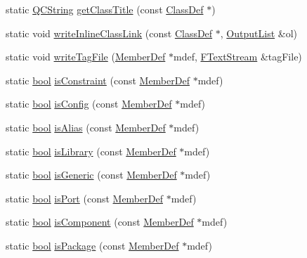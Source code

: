 \begin{DoxyCompactItemize}
\item 
static \hyperlink{class_q_c_string}{Q\+C\+String} \hyperlink{class_vhdl_doc_gen_ad5d4c791af3f2943467c7c7af558d83a}{get\+Class\+Title} (const \hyperlink{class_class_def}{Class\+Def} $\ast$)
\item 
static void \hyperlink{class_vhdl_doc_gen_a67f47b8dc11d967ee47e9bda86fff7e0}{write\+Inline\+Class\+Link} (const \hyperlink{class_class_def}{Class\+Def} $\ast$, \hyperlink{class_output_list}{Output\+List} \&ol)
\item 
static void \hyperlink{class_vhdl_doc_gen_afc349098219c01208def69e00f05e0e2}{write\+Tag\+File} (\hyperlink{class_member_def}{Member\+Def} $\ast$mdef, \hyperlink{class_f_text_stream}{F\+Text\+Stream} \&tag\+File)
\item 
static \hyperlink{qglobal_8h_a1062901a7428fdd9c7f180f5e01ea056}{bool} \hyperlink{class_vhdl_doc_gen_adb04cd03e2039ecab3a0a8f31ee4c890}{is\+Constraint} (const \hyperlink{class_member_def}{Member\+Def} $\ast$mdef)
\item 
static \hyperlink{qglobal_8h_a1062901a7428fdd9c7f180f5e01ea056}{bool} \hyperlink{class_vhdl_doc_gen_a57efdf5bddd0b36667c8aa21256ebac7}{is\+Config} (const \hyperlink{class_member_def}{Member\+Def} $\ast$mdef)
\item 
static \hyperlink{qglobal_8h_a1062901a7428fdd9c7f180f5e01ea056}{bool} \hyperlink{class_vhdl_doc_gen_af13dd5eb831c1df008b0fd41928f4b7c}{is\+Alias} (const \hyperlink{class_member_def}{Member\+Def} $\ast$mdef)
\item 
static \hyperlink{qglobal_8h_a1062901a7428fdd9c7f180f5e01ea056}{bool} \hyperlink{class_vhdl_doc_gen_a3f582b69841bae3ec6f1281604b6f0c8}{is\+Library} (const \hyperlink{class_member_def}{Member\+Def} $\ast$mdef)
\item 
static \hyperlink{qglobal_8h_a1062901a7428fdd9c7f180f5e01ea056}{bool} \hyperlink{class_vhdl_doc_gen_ae3c19429669d382581ba37aee5f39278}{is\+Generic} (const \hyperlink{class_member_def}{Member\+Def} $\ast$mdef)
\item 
static \hyperlink{qglobal_8h_a1062901a7428fdd9c7f180f5e01ea056}{bool} \hyperlink{class_vhdl_doc_gen_a73186f5d1ba5e6c11c6f006708da79a6}{is\+Port} (const \hyperlink{class_member_def}{Member\+Def} $\ast$mdef)
\item 
static \hyperlink{qglobal_8h_a1062901a7428fdd9c7f180f5e01ea056}{bool} \hyperlink{class_vhdl_doc_gen_ad3fdc795bf951ef11221894512b8bc6c}{is\+Component} (const \hyperlink{class_member_def}{Member\+Def} $\ast$mdef)
\item 
static \hyperlink{qglobal_8h_a1062901a7428fdd9c7f180f5e01ea056}{bool} \hyperlink{class_vhdl_doc_gen_aca017e059b8a2972c2cad968800c0564}{is\+Package} (const \hyperlink{class_member_def}{Member\+Def} $\ast$mdef)

\end{DoxyCompactItemize}
